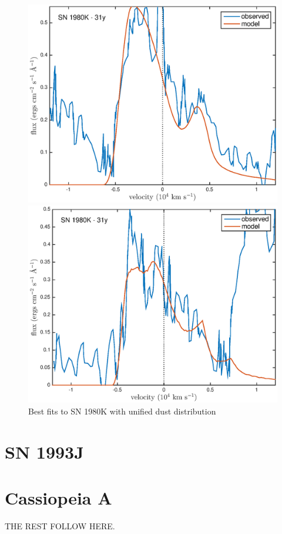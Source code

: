 \begin{figure}
\centering
\includegraphics[scale=0.8,clip=true, trim=20 10 40 20]{chapters/chapter6/figs/80K/simultaneous/Ha_31y}

\includegraphics[scale=0.8,clip=true, trim=20 0 40 20]{chapters/chapter6/figs/80K/simultaneous/OI_31y}
\caption{Best fits to SN 1980K with unified dust distribution}
\label{80K_best}
\end{figure}

\section{SN 1993J}
\section{Cassiopeia A}
THE REST FOLLOW HERE. 


